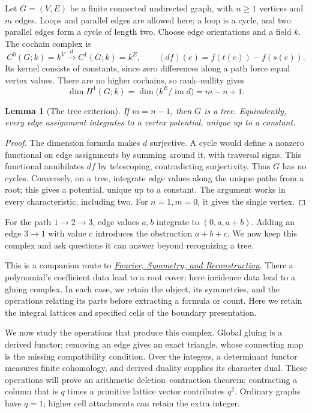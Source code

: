 \documentclass[11pt]{article}
\newtheorem{lemma}[theorem]{Lemma}
\theoremstyle{definition}
\theoremstyle{remark}
\begin{document}
Let \(G=(V,E)\) be a finite connected undirected graph, with \(n\ge1\) vertices and \(m\) edges. Loops and parallel edges are allowed here; a loop is a cycle, and two parallel edges form a cycle of length two. Choose edge orientations and a field \(k\). The cochain complex is
\[
 C^0(G;k)=k^V\xrightarrow{d}C^1(G;k)=k^E,
 \qquad (df)(e)=f(t(e))-f(s(e)).
\]
Its kernel consists of constants, since zero differences along a path force equal vertex values. There are no higher cochains, so rank--nullity gives
\begin{equation}\label{eq:cycle-rank}
 \dim H^1(G;k)=\dim\bigl(k^E/\operatorname{im}d\bigr)=m-n+1.
\end{equation}

\begin{lemma}[The tree criterion]\label{thm:tree}
If \(m=n-1\), then \(G\) is a tree. Equivalently, every edge assignment integrates to a vertex potential, unique up to a constant.
\end{lemma}
\begin{proof}
The dimension formula makes \(d\) surjective. A cycle would define a nonzero functional on edge assignments by summing around it, with traversal signs. This functional annihilates \(df\) by telescoping, contradicting surjectivity. Thus \(G\) has no cycles. Conversely, on a tree, integrate edge values along the unique paths from a root; this gives a potential, unique up to a constant. The argument works in every characteristic, including two. For \(n=1,m=0\), it gives the single vertex.
\end{proof}

For the path \(1\to2\to3\), edge values \(a,b\) integrate to \((0,a,a+b)\). Adding an edge \(3\to1\) with value \(c\) introduces the obstruction \(a+b+c\). We now keep this complex and ask questions it can answer beyond recognizing a tree.

This is a companion route to \href{https://tensorgami.com/notes/fourier-symmetry-and-reconstruction}{\emph{Fourier, Symmetry, and Reconstruction}}. There a polynomial's coefficient data lead to a root cover; here incidence data lead to a gluing complex. In each case, we retain the object, its symmetries, and the operations relating its parts before extracting a formula or count. Here we retain the integral lattices and specified cells of the boundary presentation.

We now study the operations that produce this complex. Global gluing is a derived functor; removing an edge gives an exact triangle, whose connecting map is the missing compatibility condition. Over the integers, a determinant functor measures finite cohomology, and derived duality supplies its character dual. These operations will prove an arithmetic deletion--contraction theorem: contracting a column that is $q$ times a primitive lattice vector contributes $q^2$. Ordinary graphs have $q=1$; higher cell attachments can retain the extra integer.
\end{document}
